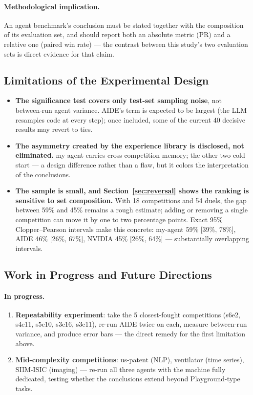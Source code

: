 \documentclass[11pt,a4paper]{article}
\begin{document}
\paragraph{Methodological implication.} An agent benchmark's conclusion must be stated together with the composition of its evaluation set, and should report both an absolute metric (PR) and a relative one (paired win rate) --- the contrast between this study's two evaluation sets is direct evidence for that claim.

\subsection{Limitations of the Experimental Design}

\begin{itemize}[leftmargin=*]
  \item \textbf{The significance test covers only test-set sampling noise}, not between-run agent variance. AIDE's term is expected to be largest (the LLM resamples code at every step); once included, some of the current 40 decisive results may revert to ties.
  \item \textbf{The asymmetry created by the experience library is disclosed, not eliminated.} my-agent carries cross-competition memory; the other two cold-start --- a design difference rather than a flaw, but it colors the interpretation of the conclusions.
  \item \textbf{The sample is small, and Section~\ref{sec:reversal} shows the ranking is sensitive to set composition.} With 18 competitions and 54 duels, the gap between 59\% and 45\% remains a rough estimate; adding or removing a single competition can move it by one to two percentage points. Exact 95\% Clopper--Pearson intervals make this concrete: my-agent 59\% [39\%, 78\%], AIDE 46\% [26\%, 67\%], NVIDIA 45\% [26\%, 64\%] --- substantially overlapping intervals.
\end{itemize}

\subsection{Work in Progress and Future Directions}
\label{sec:future}

\paragraph{In progress.}
\begin{enumerate}[leftmargin=*]
  \item \textbf{Repeatability experiment}: take the 5 closest-fought competitions (s6e2, s4e11, s5e10, s3e16, s3e11), re-run AIDE twice on each, measure between-run variance, and produce error bars --- the direct remedy for the first limitation above.
  \item \textbf{Mid-complexity competitions}: us-patent (NLP), ventilator (time series), SIIM-ISIC (imaging) --- re-run all three agents with the machine fully dedicated, testing whether the conclusions extend beyond Playground-type tasks.
\end{enumerate}
\end{document}
